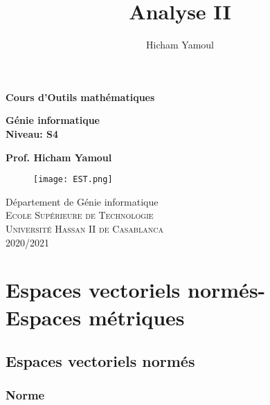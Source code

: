 \documentclass[11pt,a4paper]{report}
\author{Hicham Yamoul}
\title{Analyse II}
\begin{document}
 \begin{titlepage}

\begin{center}


{\Huge  \textbf{\textmd{Cours d'Outils mathématiques}}\\[0.5in]}



       \Large{\bf Génie informatique\\
       Niveau: S4 }\\[0.5in]



\vspace{.1in}

{\Large\textbf{Prof. Hicham Yamoul}}\\[0.2in]

\vfill

\begin{figure}
\begin{center}
\texttt{[image: EST.png]}

\end{center}
\end{figure}
\Large{Département de Génie informatique}\\
\normalsize
\Large\textsc{Ecole Supérieure de Technologie\\Université Hassan II de Casablanca }\\

\vspace{0.2cm}
2020/2021

\end{center}

\end{titlepage}
\newpage




\chapter{Espaces vectoriels normés-\\Espaces métriques}


\section{Espaces vectoriels normés}

\subsection{Norme}
\end{document}
